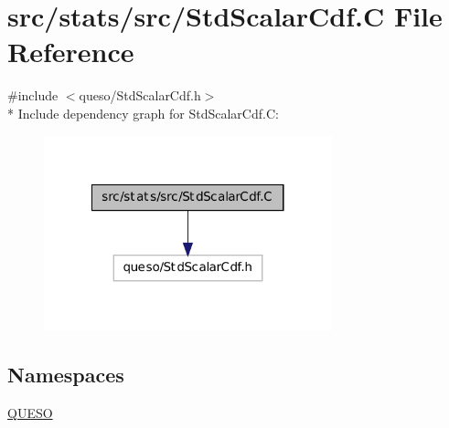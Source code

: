 \hypertarget{_std_scalar_cdf_8_c}{\section{src/stats/src/\-Std\-Scalar\-Cdf.C File Reference}
\label{_std_scalar_cdf_8_c}
}
{\ttfamily \#include $<$queso/\-Std\-Scalar\-Cdf.\-h$>$}\\*
Include dependency graph for Std\-Scalar\-Cdf.\-C\-:
\nopagebreak
\begin{figure}[H]
\begin{center}
\leavevmode
\includegraphics[width=236pt]{_std_scalar_cdf_8_c__incl}
\end{center}
\end{figure}
\subsection*{Namespaces}
\begin{DoxyCompactItemize}
\item 
\hyperlink{namespace_q_u_e_s_o}{Q\-U\-E\-S\-O}
\end{DoxyCompactItemize}
